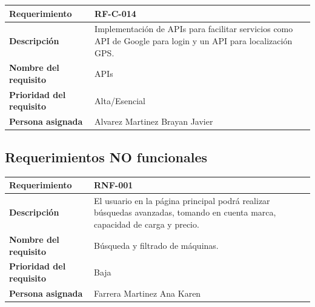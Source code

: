 \documentclass{article}
\begin{document}
\begin{center}
\begin{tabular}{|p{3cm}|p{9cm}|}
\hline
\textbf{Requerimiento} & RF-C-014 \\
\hline
\textbf{Descripción} & Implementación de APIs para facilitar servicios como API de Google para login y un API para localización GPS. \\
\hline
\textbf{Nombre del requisito} & APIs \\
\hline
\textbf{Prioridad del requisito} & Alta/Esencial \\
\hline
\textbf{Persona asignada} & Alvarez Martinez Brayan Javier \\
\hline
\end{tabular}
\end{center}

\subsection{Requerimientos NO funcionales}
\begin{center}
\begin{tabular}{|p{3cm}|p{9cm}|}
\hline
\textbf{Requerimiento} & RNF-001 \\
\hline
\textbf{Descripción} & El usuario en la página principal podrá realizar búsquedas avanzadas, tomando en cuenta marca, capacidad de carga y precio. \\
\hline
\textbf{Nombre del requisito} & Búsqueda y filtrado de máquinas. \\
\hline
\textbf{Prioridad del requisito} & Baja \\
\hline
\textbf{Persona asignada} & Farrera Martinez Ana Karen \\
\hline
\end{tabular}
\end{center}
\end{document}
